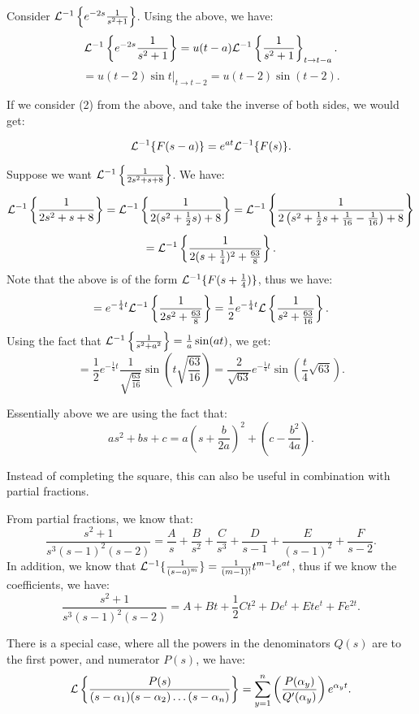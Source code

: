 \documentclass[../main/main.tex]{subfiles}
\begin{document}
\begin{example}
	Consider $\mathcal{L} ^{-1} \left\{e^{-2s}\frac{1}{s^2+1}\right\} $. Using the above, we have: \[
		\mathcal{L} ^{-1}\left\{e^{-2s}\frac{1}{s^2+1}\right\} = u(t-a) \mathcal{L}^{-1} \left\{\frac{1}{s^2+1}\right\}_{t\to t-a} 
	.\] \[
= u(t-2) \sin t \big\rvert_{t\to t-2} = u(t-2)\sin(t-2)
	.\] 
\end{example}
If we consider (2) from the above, and take the inverse of both sides, we would get:
\begin{theorem}
	\[
		\mathcal{L} ^{-1} \{F(s-a)\} = e^{at}\mathcal{L} ^{-1} \{F(s)\} 
	.\] 	
\end{theorem}
\begin{example}
	Suppose we want $\mathcal{L} ^{-1} \left\{ \frac{1}{2s^2+s+8}\right\}$. We have: \[
		\mathcal{L} ^{-1} \left\{ \frac{1}{2s^2+s+8}\right\} = \mathcal{L} ^{-1} \left\{ \frac{1}{2(s^2+\frac{1}{2}s)+8}\right\} = \mathcal{L}^{-1}\left\{ \frac{1}{2\left( s^2+\frac{1}{2}s+\frac{1}{16}-\frac{1}{16} \right) +8}\right\}
	\] \[
	= \mathcal{L}^{-1} \left\{ \frac{1}{2(s+\frac{1}{4})^2+\frac{63}{8}}  \right\} 
.\] Note that the above is of the form $\mathcal{L}^{-1}\{F(s+\frac{1}{4})\} $, thus we have: \[
= e^{-\frac{1}{4}t}\mathcal{L}^{-1} \left\{\frac{1}{2s^2+\frac{63}{8}}\right\} = \frac{1}{2}e^{-\frac{1}{4}t}\mathcal{L} \left\{ \frac{1}{s^2+\frac{63}{16}}\right\}
.\] Using the fact that $\mathcal{L}^{-1}\left\{ \frac{1}{s^2+a^2}\right\} = \frac{1}{a}\sin(at)$, we get: \[
= \frac{1}{2}e^{-\frac{1}{4}t} \frac{1}{\sqrt{\frac{63}{16}} }\sin\left( t \sqrt{\frac{63}{16}}  \right) = \frac{2}{\sqrt{63} }e^{-\frac{1}{4}t}\sin\left( \frac{t}{4}\sqrt{63}  \right) 
.\] 
\end{example}
\begin{remark}
	Essentially above we are using the fact that: \[
		as^2+bs+c = a\left( s+\frac{b}{2a} \right) ^2 + \left( c-\frac{b^2}{4a} \right) 
	.\] 
\end{remark}
Instead of completing the square, this can also be useful in combination with partial fractions. 
\begin{example}
	From partial fractions, we know that: \[
		\frac{s^2+1}{s^{3}(s-1)^2(s-2)}= \frac{A}{s}+ \frac{B}{s^2}+\frac{C}{s^{3}}+ \frac{D}{s-1}+\frac{E}{(s-1)^2}+\frac{F}{s-2}
	.\] 
	In addition, we know that $\mathcal{L} ^{-1} \{\frac{1}{(s-a)^m}\} = \frac{1}{(m-1)!}t ^{m-1}e^{at}$, thus if we know the coefficients, we have:  \[
		\frac{s^2+1}{s^{3}(s-1)^2(s-2)}= A+Bt+\frac{1}{2}Ct^2+De^{t}+Ete^{t}+Fe^{2t} 
	.\] 
\end{example}
\begin{theorem}
	There is a special case, where all the powers in the denominators $Q(s)$ are to the first power, and numerator $P(s)$, we have:
	\[
		\mathcal{L} \left\{ \frac{P(s)}{(s-\alpha_1)(s-\alpha_2)\ldots(s-\alpha_n)} \right\} = \sum_{y=1}^{n} \left( \frac{P(\alpha_y)}{Q'(\alpha_y)} \right) e^{\alpha_y t}
	.\] 
\end{theorem}
\end{document}
